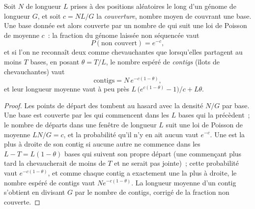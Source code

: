 \begin{theorem}\label{thm:b3:genomics:lander-waterman}
Soit $N$  de longueur $L$ prises à des positions aléatoires le
long d'un génome de longueur $G$, et soit $c = NL/G$ la
\emph{couverture}, nombre moyen de  couvrant une base. Une base
donnée est alors couverte par un nombre de  qui suit une loi de
Poisson de moyenne $c$~: la fraction du génome laissée non séquencée
vaut
\[
P(\text{non couvert}) = e^{-c},
\]
et si l'on ne reconnaît deux  comme chevauchantes que
lorsqu'elles partagent au moins $T$ bases, en posant $\theta = T/L$, le
nombre espéré de \emph{contigs} (îlots de  chevauchantes) vaut
\[
\text{contigs} = N\,e^{-c(1-\theta)},
\]
et leur longueur moyenne vaut à peu près
$L\,\bigl(e^{c(1-\theta)} - 1\bigr)/c + L\theta$.
\end{theorem}
\begin{proof}
Les points de départ des  tombent au hasard avec la densité
$N/G$ par base. Une base est couverte par les  qui commencent
dans les $L$ bases qui la précèdent~; le nombre de départs dans une
fenêtre de longueur $L$ suit une loi de Poisson de moyenne $LN/G
= c$, et la probabilité qu'il n'y en ait aucun vaut $e^{-c}$. Une
 est la plus à droite de son contig si aucune autre  ne
commence dans les $L - T = L(1-\theta)$ bases qui suivent son propre
départ (une  commençant plus tard la chevaucherait de moins de
$T$ et ne serait pas jointe)~; cette probabilité vaut
$e^{-c(1-\theta)}$, et comme chaque contig a exactement une  la
plus à droite, le nombre espéré de contigs vaut $N e^{-c(1-\theta)}$.
La longueur moyenne d'un contig s'obtient en divisant $G$ par le nombre
de contigs, corrigé de la fraction non couverte.
\end{proof}

